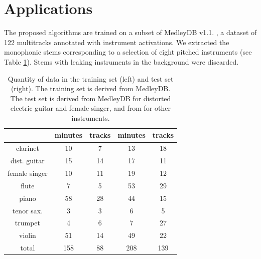 \documentclass{article}
\begin{document}
\section{Applications}\label{sec:single-instrument}
The proposed algorithms are trained on a subset of MedleyDB v1.1. \cite{Bittner2014},
a dataset of 122 multitracks annotated with instrument activations.
We extracted the monophonic stems corresponding to a selection of eight pitched
instruments (see Table \ref{table:single-label-durations}).
Stems with leaking instruments in the background were discarded.

\begin{table}
    \begin{center}
    \begin{tabular}{|c|cc|cc|}
        \hline
        & minutes & tracks & minutes & tracks \\
        \hline
        clarinet & 10 & 7 & 13 & 18 \\
        dist. guitar & 15 & 14 & 17 & 11 \\
        female singer & 10 & 11 & 19 & 12 \\
        flute & 7 & 5 & 53 & 29 \\
        piano & 58 & 28 & 44 & 15 \\
        tenor sax. & 3 & 3 & 6 & 5 \\
        trumpet & 4 & 6 & 7 & 27 \\
        violin & 51 & 14 & 49 & 22 \\
        \hline
        total & 158 & 88 & 208 & 139 \\
        \hline
    \end{tabular}
    \end{center}
    \caption{
    Quantity of data in the training set (left) and test set (right).
    The training set is derived from MedleyDB.
    The test set is derived from MedleyDB for distorted electric guitar and female singer,
    and from \cite{Joder2009} for other instruments.
    \label{table:single-label-durations}}
\end{table}
\end{document}
